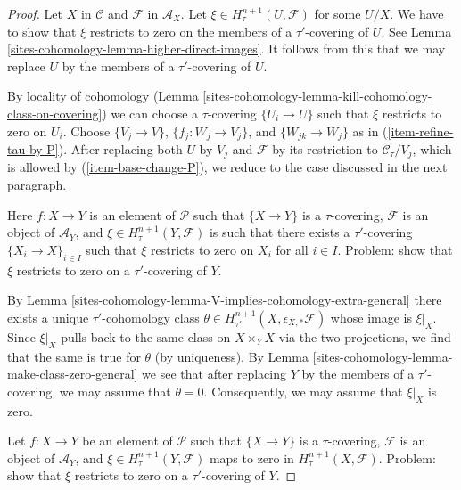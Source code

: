 \begin{proof}
Let $X$ in $\mathcal{C}$ and $\mathcal{F}$ in $\mathcal{A}_X$.
Let $\xi \in H^{n + 1}_\tau(U, \mathcal{F})$ for some $U/X$.
We have to show that $\xi$ restricts to zero on the members of
a $\tau'$-covering of $U$. See
Lemma \ref{sites-cohomology-lemma-higher-direct-images}.
It follows from this that we may
replace $U$ by the members of a $\tau'$-covering of $U$.

\medskip\noindent
By locality of cohomology
(Lemma \ref{sites-cohomology-lemma-kill-cohomology-class-on-covering})
we can choose a $\tau$-covering $\{U_i \to U\}$
such that $\xi$ restricts to zero on $U_i$.
Choose $\{V_j \to V\}$, $\{f_j : W_j \to V_j\}$, and
$\{W_{jk} \to W_j\}$ as in (\ref{item-refine-tau-by-P}).
After replacing both $U$ by $V_j$
and $\mathcal{F}$ by its restriction to
$\mathcal{C}_\tau/V_j$, which is allowed by
(\ref{item-base-change-P}), we reduce to the
case discussed in the next paragraph.

\medskip\noindent
Here $f : X \to Y$ is an element of $\mathcal{P}$
such that $\{X \to Y\}$ is a $\tau$-covering,
$\mathcal{F}$ is an object of $\mathcal{A}_Y$, and
$\xi \in H^{n + 1}_\tau(Y, \mathcal{F})$ is such that
there exists a $\tau'$-covering $\{X_i \to X\}_{i \in I}$
such that $\xi$ restricts to zero on $X_i$ for all $i \in I$.
Problem: show that $\xi$ restricts to zero on a $\tau'$-covering of $Y$.

\medskip\noindent
By Lemma \ref{sites-cohomology-lemma-V-implies-cohomology-extra-general} there exists a
unique $\tau'$-cohomology class
$\theta \in H^{n + 1}_{\tau'}(X, \epsilon_{X, *}\mathcal{F})$
whose image is $\xi|_X$.
Since $\xi|_X$ pulls back to the same class on $X \times_Y X$
via the two projections, we find that the same is true for $\theta$
(by uniqueness).
By Lemma \ref{sites-cohomology-lemma-make-class-zero-general}
we see that after replacing $Y$ by the members of a $\tau'$-covering,
we may assume that $\theta = 0$.
Consequently, we may assume that $\xi|_X$ is zero.

\medskip\noindent
Let $f : X \to Y$ be an element of $\mathcal{P}$
such that $\{X \to Y\}$ is a $\tau$-covering,
$\mathcal{F}$ is an object of $\mathcal{A}_Y$, and
$\xi \in H^{n + 1}_\tau(Y, \mathcal{F})$
maps to zero in $H^{n + 1}_\tau(X, \mathcal{F})$.
Problem: show that $\xi$ restricts to zero on a $\tau'$-covering of $Y$.


\end{proof}
